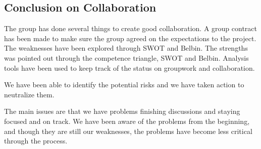 
\subsection{Conclusion on Collaboration}

The group has done several things to create good collaboration. A group contract has been made to make sure the group agreed on the expectations to the project. The weaknesses have been explored through SWOT and Belbin. The strengths was pointed out through the competence triangle, SWOT and Belbin. Analysis tools have been used to keep track of the status on groupwork and collaboration.

We have been able to identify the potential risks and we have taken action to neutralize them. 

The main issues are that we have problems finishing discussions and staying focused and on track. We have been aware of the problems from the beginning, and though they are still our weaknesses, the problems have become less critical through the process.
